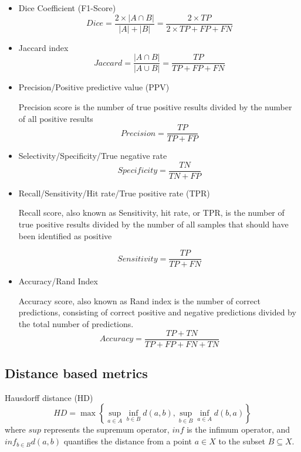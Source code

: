 \begin{itemize}

\item Dice Coefficient (F1-Score)
\begin{equation}
Dice = \frac{2 \times |A \cap B|}{|A| + |B|} = \frac{2 \times TP}{2 \times TP + FP + FN}
\end{equation}



\item Jaccard index
\begin{equation}
Jaccard = \frac{|A \cap B|}{|A \cup B|} = \frac{TP}{TP + FP + FN}
\end{equation}

\item Precision/Positive predictive value (PPV)

Precision score is the number of true positive results divided by the number of all positive results
\begin{equation}
Precision = \frac{TP}{TP + FP}
\end{equation}

\item Selectivity/Specificity/True negative rate
\begin{equation}
Specificity = \frac{TN}{TN + FP}
\end{equation}


\item Recall/Sensitivity/Hit rate/True positive rate (TPR)

Recall score, also known as Sensitivity, hit rate, or TPR, is the number of true positive results divided by the number of all samples that should have been identified as positive

\begin{equation}
Sensitivity = \frac{TP}{TP + FN}
\end{equation}


\item Accuracy/Rand Index

Accuracy score, also known as Rand index is the number of correct predictions, consisting of correct positive and negative predictions divided by the total number of predictions.
\begin{equation}
    Accuracy = \frac{TP + TN}{TP + FP + FN + TN}
\end{equation}

\end{itemize}

\subsection{Distance based metrics}
Hausdorff distance (HD)
\begin{equation}
HD = \max \left\{ \sup_{a \in A} \inf_{b \in B} d(a, b), \sup_{b \in B} \inf_{a \in A} d(b, a) \right\}
\end{equation}
where $sup$ represents the supremum operator, $inf$ is the infimum operator, and $inf_{b \in B} d(a, b)$ quantifies the distance from a point $a \in X$ to the subset $B \subseteq X$.

